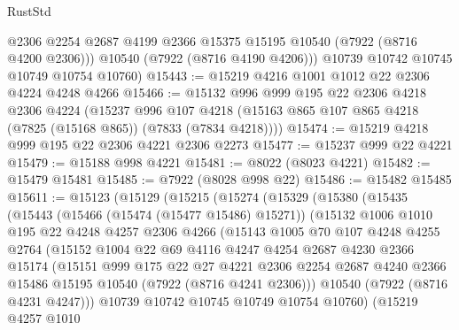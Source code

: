 \begin{lexlean}{RustStd}
\begin{coremodule}
          @2306
          @2254
          @2687
          @4199
          @2366
          @15375
          @15195
          @10540
          (@7922 (@8716 @4200 @2306)))
        @10540
        (@7922 (@8716 @4190 @4206)))
      @10739
      @10742
      @10745
      @10749
      @10754
      @10760)
@15443 := @15219 @4216 @1001 @1012 @22 @2306 @4224 @4248 @4266
@15466 := @15132
    @996
    @999
    @195
    @22
    @2306
    @4218
    @2306
    @4224
    (@15237
      @996
      @107
      @4218
      (@15163 @865 @107 @865 @4218 (@7825 (@15168 @865)) (@7833 (@7834 @4218))))
@15474 := @15219 @4218 @999 @195 @22 @2306 @4221 @2306 @2273
@15477 := @15237 @999 @22 @4221
@15479 := @15188 @998 @4221
@15481 := @8022 (@8023 @4221)
@15482 := @15479 @15481
@15485 := @7922 (@8028 @998 @22)
@15486 := @15482 @15485
@15611 := @15123
    (@15129
      (@15215
        (@15274
          (@15329
            (@15380
              (@15435
                (@15443
                  (@15466 (@15474 (@15477 @15486) @15271))
                  (@15132
                    @1006
                    @1010
                    @195
                    @22
                    @4248
                    @4257
                    @2306
                    @4266
                    (@15143
                      @1005
                      @70
                      @107
                      @4248
                      @4255
                      @2764
                      (@15152
                        @1004
                        @22
                        @69
                        @4116
                        @4247
                        @4254
                        @2687
                        @4230
                        @2366
                        @15174
                        (@15151
                          @999
                          @175
                          @22
                          @27
                          @4221
                          @2306
                          @2254
                          @2687
                          @4240
                          @2366
                          @15486
                          @15195
                          @10540
                          (@7922 (@8716 @4241 @2306)))
                        @10540
                        (@7922 (@8716 @4231 @4247)))
                      @10739
                      @10742
                      @10745
                      @10749
                      @10754
                      @10760)
                    (@15219
                      @4257
                      @1010

\end{coremodule}
\end{lexlean}
